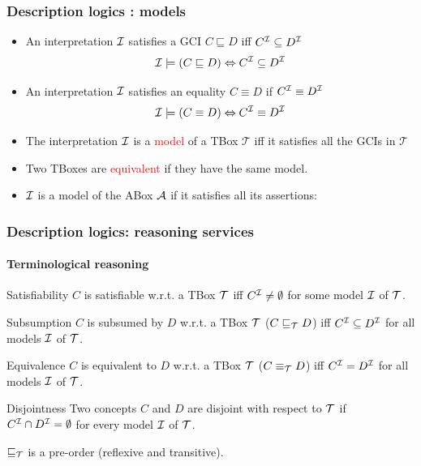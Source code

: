 \documentclass{beamer}
\newcommand{\T}{{\cal{T}}}
\newcommand{\I}{{\cal{I}}}
\newcommand{\A}{{\cal{A}}}
\begin{document}
\begin{frame}
\frametitle{Description logics : models }
\begin{block}{}
\begin{itemize}
\footnotesize
\item An interpretation $\I$ satisfies a GCI $C \sqsubseteq D$ iff $C^\I \subseteq D^\I$
\[
\I \models (C\sqsubseteq D) \Leftrightarrow C^\I \subseteq D^\I
\]
\item An interpretation $\I$ satisfies an equality $C \equiv D$ if $C^\I \equiv D^\I$
\[
\I \models (C\equiv D)  \Leftrightarrow C^\I \equiv D^\I
\]
\item The interpretation $\I$  is a \textcolor{red}{model} of a TBox $\mathcal{T}$ iff it satisfies all the GCIs in $\mathcal{T}$
\item Two TBoxes are \textcolor{red}{equivalent} if they have the same model.
\item $\I$ is a model of the ABox $\A$ if it satisfies all its assertions:

\end{itemize}
\end{block}

\end{frame}






\begin{frame}
\frametitle{Description logics: reasoning services}
\framesubtitle{Terminological reasoning}
\begin{block}{Satisfiability}
\footnotesize
$C$ is satisfiable w.r.t. a TBox $\T$ iff $C^\I \neq \emptyset$ for some model $\I$ of $\T$.
\end{block}

\begin{block}{Subsumption}
\footnotesize
$C$ is subsumed by $D$ w.r.t. a TBox $\T$ ($C \sqsubseteq_\T D$) iff $C^\I \subseteq D^\I$ for all  models $\I$ of $\T$.
\end{block}

\begin{block}{Equivalence}
\footnotesize
$C$ is equivalent to $D$ w.r.t. a TBox $\T$ ($C \equiv_\T D$) iff $C^\I = D^\I$ for all  models $\I$ of $\T$.
\end{block}

\begin{block}{Disjointness}
\footnotesize
Two concepts $C$ and $D$ are disjoint with respect to $\T$ if $C^\I \cap D^\I = \emptyset$ for every model $\I$ of $\T$.
\end{block}


\vspace{2cm}
\hfill $\sqsubseteq_\T$ is a pre-order (reflexive and transitive).


\end{frame}
\end{document}
